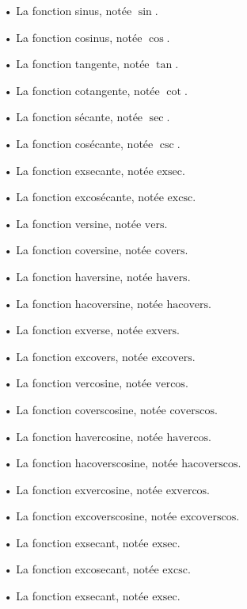 \documentclass[a4paper]{article}
\begin{document}
		\begin{itemize}
				\item [•] La fonction sinus, notée $\sin$.
				\item [•] La fonction cosinus, notée $\cos$.
				\item [•] La fonction tangente, notée $\tan$.
				\item [•] La fonction cotangente, notée $\cot$.
				\item [•] La fonction sécante, notée $\sec$.
				\item [•] La fonction cosécante, notée $\csc$.
				\item [•] La fonction exsecante, notée $\text{exsec}$.
				\item [•] La fonction excosécante, notée $\text{excsc}$.
				\item [•] La fonction versine, notée $\text{vers}$.
				\item [•] La fonction coversine, notée $\text{covers}$.
				\item [•] La fonction haversine, notée $\text{havers}$.
				\item [•] La fonction hacoversine, notée $\text{hacovers}$.
				\item [•] La fonction exverse, notée $\text{exvers}$.
				\item [•] La fonction excovers, notée $\text{excovers}$.
				\item [•] La fonction vercosine, notée $\text{vercos}$.
				\item [•] La fonction coverscosine, notée $\text{coverscos}$.
				\item [•] La fonction havercosine, notée $\text{havercos}$.
				\item [•] La fonction hacoverscosine, notée $\text{hacoverscos}$.
				\item [•] La fonction exvercosine, notée $\text{exvercos}$.
				\item [•] La fonction excoverscosine, notée $\text{excoverscos}$.
				\item [•] La fonction exsecant, notée $\text{exsec}$.
				\item [•] La fonction excosecant, notée $\text{excsc}$.
				\item [•] La fonction exsecant, notée $\text{exsec}$.
			\end{itemize}
\end{document}
